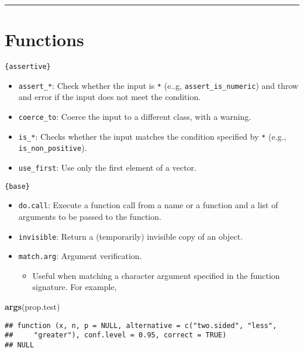 \documentclass[
]{book}
\newenvironment{Shaded}{\begin{snugshade}}{\end{snugshade}}
\newcommand{\KeywordTok}[1]{\textcolor[rgb]{0.13,0.29,0.53}{\textbf{#1}}}
\newcommand{\NormalTok}[1]{#1}
\providecommand{\tightlist}{%
  \setlength{\itemsep}{0pt}\setlength{\parskip}{0pt}}
\begin{document}
\begin{center}\rule{0.5\linewidth}{0.5pt}\end{center}

\hypertarget{functions}{%
\section{Functions}\label{functions}}

\texttt{\{assertive\}}

\begin{itemize}
\tightlist
\item
  \texttt{assert\_*}: Check whether the input is \texttt{*} (e..g, \texttt{assert\_is\_numeric}) and throw and error if the input does not meet the condition.
\item
  \texttt{coerce\_to}: Coerce the input to a different class, with a warning.
\item
  \texttt{is\_*}: Checks whether the input matches the condition specified by \texttt{*} (e.g., \texttt{is\_non\_positive}).
\item
  \texttt{use\_first}: Use only the first element of a vector.
\end{itemize}

\texttt{\{base\}}

\begin{itemize}
\tightlist
\item
  \texttt{do.call}: Execute a function call from a name or a function and a list of arguments to be passed to the function.
\item
  \texttt{invisible}: Return a (temporarily) invisible copy of an object.
\item
  \texttt{match.arg}: Argument verification.

  \begin{itemize}
  \tightlist
  \item
    Useful when matching a character argument specified in the function signature. For example,
  \end{itemize}
\end{itemize}

\begin{Shaded}
\begin{Highlighting}[]
\KeywordTok{args}\NormalTok{(prop.test)}
\end{Highlighting}
\end{Shaded}

\begin{verbatim}
## function (x, n, p = NULL, alternative = c("two.sided", "less", 
##     "greater"), conf.level = 0.95, correct = TRUE) 
## NULL
\end{verbatim}
\end{document}
